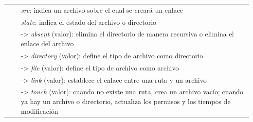 \documentclass[a4paper,12pt]{article}
\begin{document}
{\begin{center}
\begin{tabulary}{\textwidth}{l|l|L}
 &  & \emph{src}: indica un archivo sobre el cual se creará un enlace\\
 &  & \emph{state}: indica el estado del archivo o directorio\\
 &  & -> \emph{absent} (valor): elimina el directorio de manera recursiva o elimina el enlace del archivo\\
 &  & -> \emph{directory} (valor): define el tipo de archivo como directorio\\
 &  & -> \emph{file} (valor): define el tipo de archivo como archivo\\
 &  & -> \emph{link} (valor): establece el enlace entre una ruta y un archivo\\
 &  & -> \emph{touch} (valor): cuando no existe una ruta, crea un archivo vacío; cuando ya hay un archivo o directorio, actualiza los permisos y los tiempos de modificación\\
\hline
\end{tabulary}
\end{center}

}
\end{document}
